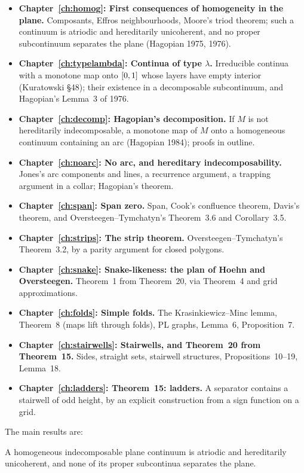 \begin{itemize}
\item \textbf{Chapter~\ref{ch:homog}: First consequences of homogeneity in the plane.} Composants, Effros neighbourhoods, Moore's triod theorem; such a continuum is
atriodic and hereditarily unicoherent, and no proper subcontinuum separates the plane (Hagopian 1975, 1976).
\item \textbf{Chapter~\ref{ch:typelambda}: Continua of type $\lambda$.} Irreducible continua with a monotone map onto $[0,1]$ whose layers have empty interior (Kuratowski \S48);
their existence in a decomposable subcontinuum, and Hagopian's Lemma~3 of 1976.
\item \textbf{Chapter~\ref{ch:decomp}: Hagopian's decomposition.} If $M$ is not hereditarily indecomposable, a monotone map of $M$ onto a homogeneous continuum containing an arc
(Hagopian 1984); proofs in outline.
\item \textbf{Chapter~\ref{ch:noarc}: No arc, and hereditary indecomposability.} Jones's arc components and lines, a recurrence argument, a trapping argument in a collar;
Hagopian's theorem.
\item \textbf{Chapter~\ref{ch:span}: Span zero.} Span, Cook's confluence theorem, Davis's theorem, and Oversteegen--Tymchatyn's Theorem~3.6 and Corollary~3.5.
\item \textbf{Chapter~\ref{ch:strips}: The strip theorem.} Oversteegen--Tymchatyn's Theorem~3.2, by a parity argument for closed polygons.
\item \textbf{Chapter~\ref{ch:snake}: Snake-likeness: the plan of Hoehn and Oversteegen.} Theorem~1 from Theorem~20, via Theorem~4 and grid approximations.
\item \textbf{Chapter~\ref{ch:folds}: Simple folds.} The Krasinkiewicz--Minc lemma, Theorem~8 (maps lift through folds), PL graphs, Lemma~6, Proposition~7.
\item \textbf{Chapter~\ref{ch:stairwells}: Stairwells, and Theorem~20 from Theorem~15.} Sides, straight sets, stairwell structures, Propositions~10--19, Lemma~18.
\item \textbf{Chapter~\ref{ch:ladders}: Theorem~15: ladders.} A separator contains a stairwell of odd height, by an explicit construction from a sign function on a grid.
\end{itemize}

The main results are:

\begin{theorem}
A homogeneous indecomposable plane continuum is atriodic and hereditarily unicoherent, and none of its proper subcontinua separates the plane.
\end{theorem}

